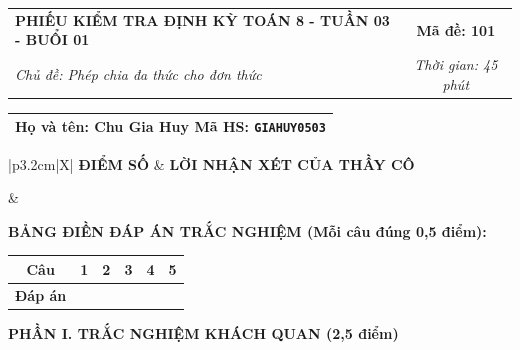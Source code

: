 \documentclass[12pt,a4paper]{article}
\begin{document}
\pagestyle{empty}



\noindent
\begin{tabularx}{\linewidth}{|X|c|}
\hline
\textbf{PHIẾU KIỂM TRA ĐỊNH KỲ TOÁN 8 - TUẦN 03 - BUỔI 01} & \textbf{Mã đề: 101} \\
\textit{Chủ đề: Phép chia đa thức cho đơn thức} & \textit{Thời gian: 45 phút} \\
\hline
\end{tabularx}

\vspace{1mm}

\noindent
\begin{tabularx}{\linewidth}{|X|}
\hline
\rule[-2mm]{0pt}{7.5mm}\textbf{Họ và tên:} \textbf{\large Chu Gia Huy} \hfill \textbf{Mã HS:} \texttt{GIAHUY0503} \quad \\
\hline
\end{tabularx}

\vspace{1mm}

\noindent
\begin{tabularx}{\linewidth}{|p{3.2cm}|X|}
\hline
\centering\textbf{ĐIỂM SỐ} & \centering\textbf{LỜI NHẬN XÉT CỦA THẦY CÔ} \tabularnewline
\hline
\rule{0pt}{1.3cm} & \tabularnewline
\hline
\end{tabularx}

\vspace{1.2mm}

\noindent\textbf{BẢNG ĐIỀN ĐÁP ÁN TRẮC NGHIỆM (Mỗi câu đúng 0,5 điểm):}
\vspace{0.8mm}

\noindent
\renewcommand{\arraystretch}{1.35}
\begin{tabularx}{\linewidth}{|c|*{5}{>{\centering\arraybackslash}X|}}
\hline
\textbf{Câu} & \textbf{1} & \textbf{2} & \textbf{3} & \textbf{4} & \textbf{5} \\
\hline
\textbf{Đáp án} & & & & & \\
\hline
\end{tabularx}
\renewcommand{\arraystretch}{1.0}

\vspace{1.5mm}

\noindent\textbf{\large PHẦN I. TRẮC NGHIỆM KHÁCH QUAN (2,5 điểm)}
\vspace{1mm}
\end{document}
